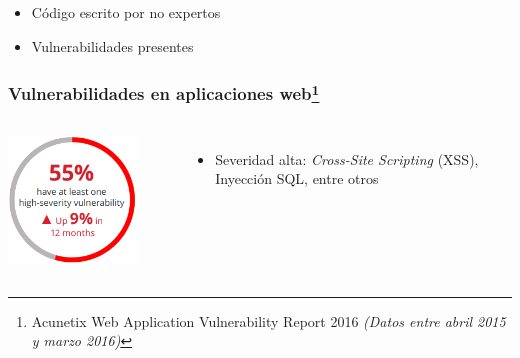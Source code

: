 \begin{frame}
\begin{itemize}
\begin{itemize}
            \item
            Código escrito por no expertos

            \item
            Vulnerabilidades presentes

        \end{itemize}
    \end{itemize}
\end{frame}

\begin{frame}[t]
    \frametitle{Vulnerabilidades en aplicaciones web\footnote{
        Acunetix Web Application Vulnerability Report 2016
        \textit{(Datos entre abril 2015 y marzo 2016)}}}

    \begin{columns}
        \vspace{-0.4cm}
        \begin{center}
            \includegraphics[width=0.8\textwidth]{images/acunetix_vuln_report-1.png}
        \end{center}

        \vspace{-0.5cm}
        \begin{itemize}
            \item
            Severidad alta:
            \textit{Cross-Site Scripting} (XSS), Inyección SQL, entre otros
        \end{itemize}


\end{columns}
\end{frame}
